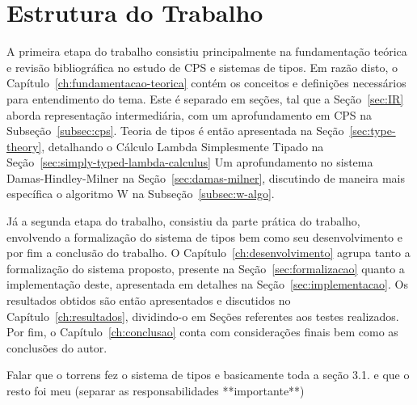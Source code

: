 \section{Estrutura do Trabalho}\label{sec:estrutura-trabalho}

A primeira etapa do trabalho consistiu principalmente na fundamentação teórica e revisão bibliográfica no estudo de CPS e sistemas de tipos.
Em razão disto, o Capítulo~\ref{ch:fundamentacao-teorica} contém os conceitos e definições necessários para entendimento do tema.
Este é separado em seções, tal que a Seção~\ref{sec:IR} aborda representação intermediária, com um aprofundamento em CPS na Subseção~\ref{subsec:cps}.
Teoria de tipos é então apresentada na Seção~\ref{sec:type-theory}, detalhando o Cálculo Lambda Simplesmente Tipado na Seção~\ref{sec:simply-typed-lambda-calculus}
Um aprofundamento no sistema Damas-Hindley-Milner na Seção~\ref{sec:damas-milner}, discutindo de maneira mais específica o algoritmo W na Subseção~\ref{subsec:w-algo}.

Já a segunda etapa do trabalho, consistiu da parte prática do trabalho, envolvendo a formalização do sistema de tipos bem como seu desenvolvimento e por fim a conclusão do trabalho.
O Capítulo~\ref{ch:desenvolvimento} agrupa tanto a formalização do sistema proposto, presente na Seção~\ref{sec:formalizacao} quanto a implementação deste, apresentada em detalhes na Seção~\ref{sec:implementacao}.
Os resultados obtidos são então apresentados e discutidos no Capítulo~\ref{ch:resultados}, dividindo-o em Seções referentes aos testes realizados.
Por fim, o Capítulo~\ref{ch:conclusao} conta com considerações finais bem como as conclusões do autor.

Falar que o torrens fez o sistema de tipos e basicamente toda a seção 3.1. e que o resto foi meu (separar as responsabilidades **importante**)
